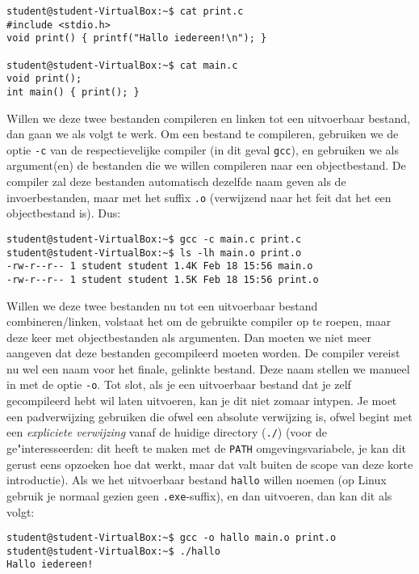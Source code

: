 \documentclass[a4paper,twoside,openany]{memoir}
\begin{document}
\begin{verbatim}
student@student-VirtualBox:~$ cat print.c
#include <stdio.h>
void print() { printf("Hallo iedereen!\n"); }

student@student-VirtualBox:~$ cat main.c
void print();
int main() { print(); }
\end{verbatim}

Willen we deze twee bestanden compileren en linken tot een uitvoerbaar bestand,
dan gaan we als volgt te werk. Om een bestand te compileren, gebruiken we de
optie \verb!-c! van de respectievelijke compiler (in dit geval \verb!gcc!), en
gebruiken we als argument(en) de bestanden die we willen compileren naar een
objectbestand. De compiler zal deze bestanden automatisch dezelfde naam geven
als de invoerbestanden, maar met het suffix \verb!.o! (verwijzend naar het feit
dat het een objectbestand is). Dus:

\begin{verbatim}
student@student-VirtualBox:~$ gcc -c main.c print.c 
student@student-VirtualBox:~$ ls -lh main.o print.o 
-rw-r--r-- 1 student student 1.4K Feb 18 15:56 main.o
-rw-r--r-- 1 student student 1.5K Feb 18 15:56 print.o
\end{verbatim}

Willen we deze twee bestanden nu tot een uitvoerbaar bestand combineren/linken,
volstaat het om de gebruikte compiler op te roepen, maar deze keer met
objectbestanden als argumenten. Dan moeten we niet meer aangeven dat deze
bestanden gecompileerd moeten worden. De compiler vereist nu wel een naam voor
het finale, gelinkte bestand. Deze naam stellen we manueel in met de optie
\verb!-o!. Tot slot, als je een uitvoerbaar bestand dat je zelf gecompileerd
hebt wil laten uitvoeren, kan je dit niet zomaar intypen. Je moet een
padverwijzing gebruiken die ofwel een absolute verwijzing is, ofwel begint met
een \emph{expliciete verwijzing} vanaf de huidige directory (\verb!./!) (voor de
ge"interesseerden: dit heeft te maken met de \verb!PATH! omgevingsvariabele, je
kan dit gerust eens opzoeken hoe dat werkt, maar dat valt buiten de scope van
deze korte introductie). Als we het uitvoerbaar bestand \verb!hallo! willen
noemen (op Linux gebruik je normaal gezien geen \verb!.exe!-suffix), en dan
uitvoeren, dan kan dit als volgt:

\begin{verbatim}
student@student-VirtualBox:~$ gcc -o hallo main.o print.o
student@student-VirtualBox:~$ ./hallo 
Hallo iedereen!
\end{verbatim}
\end{document}
